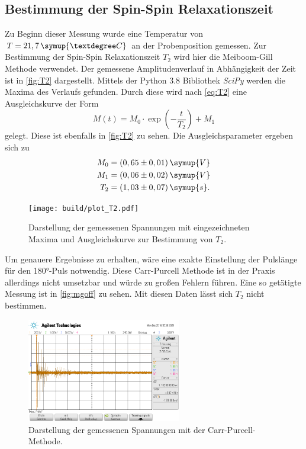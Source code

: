 \subsection{Bestimmung der Spin-Spin Relaxationszeit}
Zu Beginn dieser Messung wurde eine Temperatur von $T = 21,7 \, \symup{°C}$ an der Probenposition gemessen.
Zur Bestimmung der Spin-Spin Relaxationszeit $T_2$ wird hier die Meiboom-Gill Methode verwendet.
Der gemessene Amplitudenverlauf in Abhängigkeit der Zeit ist in \autoref{fig:T2} dargestellt.
Mittels der Python 3.8 Bibliothek \textit{SciPy}\cite{scipy} werden die Maxima des Verlaufs gefunden.
Durch diese wird nach \autoref{eq:T2} eine Ausgleichskurve der Form 
\begin{equation*}
    M(t) = M_0 \cdot \exp \left(-\frac{t}{T_2} \right) + M_1
\end{equation*}
gelegt. Diese ist ebenfalls in \autoref{fig:T2} zu sehen.
Die Ausgleichsparameter ergeben sich zu 
\begin{align*}
    M_0 &= (0,65 \pm 0,01) \, \symup{V}\\
    M_1 &= (0,06 \pm 0,02) \, \symup{V}\\
    T_2 &= (1,03 \pm 0,07) \, \symup{s}.
\end{align*}
\begin{figure}
    \centering
    \texttt{[image: build/plot\_T2.pdf]}
    \caption{Darstellung der gemessenen Spannungen mit eingezeichneten Maxima und Ausgleichskurve zur Bestimmung von $T_2$.}
    \label{fig:T2}
\end{figure}
Um genauere Ergebnisse zu erhalten, wäre eine exakte Einstellung der Pulslänge für den 180°-Puls notwendig.
Diese Carr-Purcell Methode ist in der Praxis allerdings nicht umsetzbar und würde zu großen Fehlern führen.
Eine so getätigte Messung ist in \autoref{fig:mgoff}
zu sehen. Mit diesen Daten lässt sich $T_2$ nicht bestimmen.
\begin{figure}
    \centering
    \includegraphics[width=0.6\textwidth]{data/ohnemg.png}
    \caption{Darstellung der gemessenen Spannungen mit der Carr-Purcell-Methode.}
    \label{fig:mgoff}
\end{figure}


